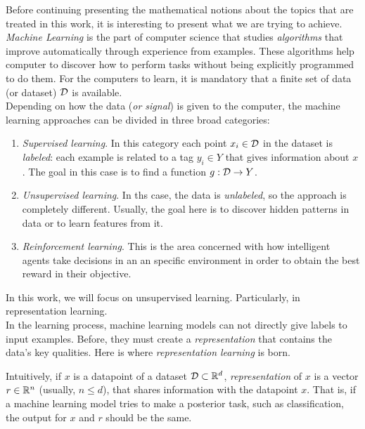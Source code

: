 


Before continuing presenting the mathematical notions about the topics that are treated in this work, it is interesting to present what we are trying to achieve.\\

\emph{Machine Learning} is the part of computer science that studies \emph{algorithms} that improve automatically through experience from examples. These algorithms help computer to discover how to
perform tasks without being explicitly programmed to do them. For the computers to learn, it is mandatory that a finite set of data (or dataset) $\mathcal{D}$ is available. \\

Depending on how the data (\emph{or signal}) is given to the computer, the machine learning approaches can be divided in three broad categories:
\begin{enumerate}
    \item \emph{Supervised learning}. In this category each point $x_i \in \mathcal{D}$ in the dataset is \emph{labeled}: each example is related to a tag $y_i \in Y$ that gives information about $x$. The goal in this case is to find 
    a function $g:\mathcal{D} \to Y$.
    \item \emph{Unsupervised learning}. In ths case, the data is \emph{unlabeled}, so the approach is completely different. Usually, the goal here is to discover hidden patterns in data or to learn features from it.
    \item \emph{Reinforcement learning}. This is the area concerned with how intelligent agents take decisions in an an specific environment in order to obtain the best reward in their objective.
\end{enumerate}

In this work, we will focus on unsupervised learning. Particularly, in representation learning.\\

In the learning process, machine learning models can not directly give labels to input examples. Before, they must create a \emph{representation} that 
contains the data's key qualities.  Here is where \emph{representation learning} is born. 


Intuitively, if $x$ is a datapoint of a dataset $\mathcal{D} \subset \mathbb{R}^d$,  \emph{representation} of $x$ is a vector $r \in \mathbb{R}^n$ (usually, $n \leq d$), that shares information with the datapoint $x$. That is, if a machine learning model
tries to make a posterior task, such as classification, the output for $x$ and $r$ should be the same.


